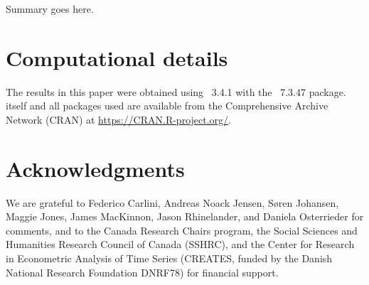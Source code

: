 \documentclass[article]{jss}
\begin{document}
Summary goes here. 



\section*{Computational details}


The results in this paper were obtained using
~3.4.1 with the
~7.3.47 package.  itself
and all packages used are available from the Comprehensive
 Archive Network (CRAN) at
\url{https://CRAN.R-project.org/}.


\section*{Acknowledgments}


We are grateful to Federico Carlini, Andreas Noack Jensen, S\o ren Johansen, Maggie Jones, James MacKinnon, Jason Rhinelander, and Daniela Osterrieder for comments, and to the Canada Research Chairs program, the Social Sciences and Humanities Research Council of Canada (SSHRC), and the Center for Research in Econometric Analysis of Time Series (CREATES, funded by the Danish National Research Foundation DNRF78) for financial support.


\end{document}
